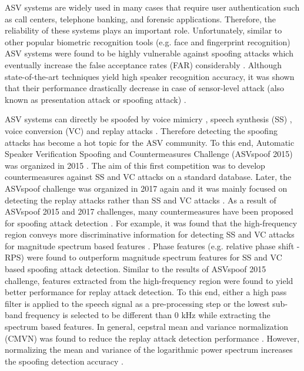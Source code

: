 \documentclass{article}
\begin{document}
ASV systems are widely used in many cases that require user authentication such as call centers, telephone banking,
and forensic applications. Therefore, the reliability of these systems plays an important role. Unfortunately, similar
to other popular biometric recognition tools (e.g. face and fingerprint recognition) ASV systems were found to be
highly vulnerable against spoofing attacks which eventually increase the false acceptance rates (FAR) considerably
\cite{alegre2014re, hadid2015biometrics, ergunay2015vulnerability, wu2016study,villalba2010speaker}. Although
state-of-the-art techniques yield high speaker recognition accuracy, it was shown that their performance drastically
decrease in case of sensor-level attack (also known as presentation attack or spoofing attack) \cite{wu2015sas,
    wu2015spoofing}.

ASV systems can directly be spoofed by voice mimicry \cite{hautamaki2015automatic}, speech synthesis (SS)
\cite{de2012evaluation}, voice conversion (VC) \cite{stylianou2009voice} and replay attacks \cite{alegre2014re}.
Therefore detecting the spoofing attacks has become a hot topic for the ASV community. To this end, Automatic Speaker
Verification Spoofing and Countermeasures Challenge (ASVspoof 2015) was organized in 2015 \cite{wu2015asvspoof}. The
aim of this first competition was to develop countermeasures against SS and VC attacks on a standard database. Later,
the ASVspoof challenge was organized in 2017 again and it was mainly focused on detecting the replay attacks rather
than SS and VC attacks \cite{kinnunen2017asvspoof}. As a result of ASVspoof 2015 and 2017 challenges, many
countermeasures have been proposed for spoofing attack detection \cite{sahidullah2015comparison, li2017study,
    witkowski2017audio}. For example, it was found that the high-frequency region conveys more discriminative
information for detecting SS and VC attacks for magnitude spectrum based features \cite{sahidullah2015comparison}.
Phase features (e.g. relative phase shift - RPS) were found to outperform magnitude spectrum features for SS and VC
based spoofing attack detection. Similar to the results of ASVspoof 2015 challenge, features extracted from the
high-frequency region were found to yield better performance for replay attack detection. To this end, either a high
pass filter is applied to the speech signal as a pre-processing step or the lowest sub-band frequency is selected to be
different than 0 kHz while extracting the spectrum based features. In general, cepstral mean and variance normalization
(CMVN) was found to reduce the replay attack detection performance \cite{nagarsheth2017replay}. However, normalizing
the mean and variance of the logarithmic power spectrum increases the spoofing detection accuracy
\cite{lavrentyeva2017audio}.
\end{document}
